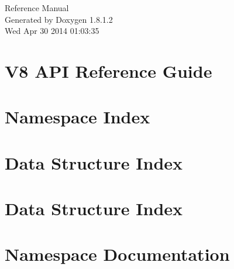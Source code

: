 \documentclass{book}
\begin{document}
\hypersetup{pageanchor=false,citecolor=blue}
\begin{titlepage}
\vspace*{7cm}
\begin{center}
{\Large Reference Manual}\\
\vspace*{1cm}
{\large Generated by Doxygen 1.8.1.2}\\
\vspace*{0.5cm}
{\small Wed Apr 30 2014 01:03:35}\\
\end{center}
\end{titlepage}
\clearemptydoublepage
{}
\tableofcontents
\clearemptydoublepage
{}
\hypersetup{pageanchor=true,citecolor=blue}
\chapter{V8 A\-P\-I Reference Guide}
\label{index}\hypertarget{index}{}
\chapter{Namespace Index}

\chapter{Data Structure Index}

\chapter{Data Structure Index}

\chapter{Namespace Documentation}

\end{document}
